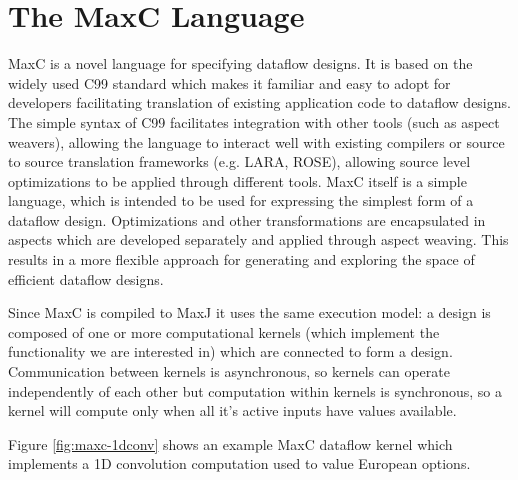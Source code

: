 \section{The  MaxC Language}

MaxC is a novel language for specifying dataflow designs. It is based
on the widely used C99 standard which makes it familiar and easy to
adopt for developers facilitating translation of existing application
code to dataflow designs. The simple syntax of C99 facilitates
integration with other tools (such as aspect weavers), allowing the
language to interact well with existing compilers or source to source
translation frameworks (e.g. LARA, ROSE), allowing source level
optimizations to be applied through different tools. MaxC itself is a
simple language, which is intended to be used for expressing the
simplest form of a dataflow design. Optimizations and other
transformations are encapsulated in aspects which are developed
separately and applied through aspect weaving. This results in a more
flexible approach for generating and exploring the space of efficient
dataflow designs.

\begin{comment}
  We identify the following requirements for any dataflow language:
  \begin{enumerate}
  \item intuitive and easy to use
  \item facilitate translation of existing applications
  \item interacts well with
    high-level tools
  \end{enumerate}
\end{comment}

Since MaxC is compiled to MaxJ it uses the same execution model: a
design is composed of one or more computational kernels (which
implement the functionality we are interested in) which are connected
to form a design. Communication between kernels is asynchronous, so
kernels can operate independently of each other but computation within
kernels is synchronous, so a kernel will compute only when all it's
active inputs have values available.

Figure \ref{fig:maxc-1dconv} shows an example MaxC dataflow kernel
which implements a 1D convolution computation used to value European
options.


\lstset{style=MaxC}

